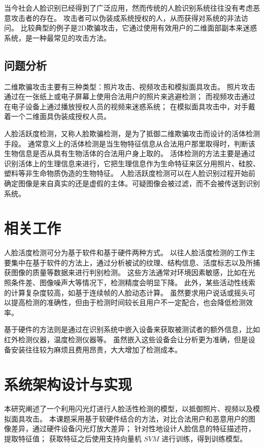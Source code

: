 \documentclass[conference]{IEEEtran}
\begin{document}
当今社会人脸识别已经得到了广泛应用，然而传统的人脸识别系统往往没有考虑恶意攻击者的存在。
攻击者可以伪装成系统授权的人，从而获得对系统的非法访问。
比较典型的例子是2D欺骗攻击，它通过使用有效用户的二维面部副本来迷惑系统，是一种最常见的攻击方法。

\subsection{问题分析}
二维欺骗攻击主要有三种类型：照片攻击、视频攻击和模拟面具攻击。
照片攻击通过在一张纸上或电子屏幕上使用合法用户的照片来逃避检测；
而视频攻击通过在电子设备上通过播放授权人员的视频来迷惑系统；
在模拟面具攻击中，对手戴着一个二维面具伪装成授权人员。

人脸活跃度检测，又称人脸欺骗检测，是为了抵御二维欺骗攻击而设计的活体检测手段。
通常意义上的活体检测是当生物特征信息从合法用户那里取得时，判断该生物信息是否从具有生物活体的合法用户身上取的。
活体检测的方法主要是通过识别活体上的生理信息来进行，它把生理信息作为生命特征来区分用照片、硅胶、塑料等非生命物质伪造的生物特征。
人脸活跃度检测可以在人脸识别过程开始前确定图像是来自真实的还是虚假的主体。可疑图像会被过滤，而不会被传送到识别系统。

\section{相关工作}
人脸活度检测可分为基于软件和基于硬件两种方式。
以往人脸活度检测的工作主要集中在基于软件的方法上，通过分析被试的纹理、结构信息、活度标志以及所捕获图像的质量等数据来进行判别检测。
这些方法通常对环境因素敏感，比如在光照条件差、图像噪声大等情况下，检测精度会明显下降。
此外，某些活动性线索的计算复杂度较高，如基于连续帧的人脸动态计算。
虽然要求用户说话或摇头可以提高检测的准确性，但由于检测时间较长且用户不一定配合，也会降低检测效率。

基于硬件的方法则是通过在识别系统中嵌入设备来获取被测试者的额外信息，比如红外检测仪器，温度检测仪器等。
虽然嵌入这些设备会让分析更为准确，但是设备安装往往较为麻烦且费用昂贵，大大增加了检测成本。

\section{系统架构设计与实现}
本研究阐述了一个利用闪光灯进行人脸活性检测的模型，以抵御照片、视频以及模拟面具攻击。
本课题采用基于软硬件结合的方法，对比合法用户和恶意用户的图像差异，通过硬件设备闪光灯放大差异；
针对性地设计人脸信息的特征描述符，提取特征值；
获取特征之后使用支持向量机 $SVM$ 进行训练，得到训练模型。
\end{document}
